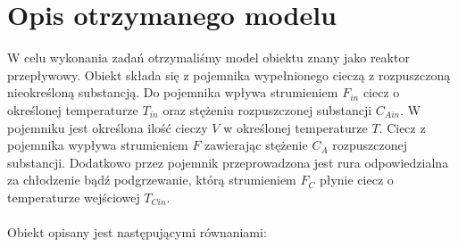 \chapter{Opis otrzymanego modelu}

W celu wykonania zadań otrzymaliśmy model obiektu znany jako reaktor przepływowy. Obiekt składa się z pojemnika wypełnionego cieczą z rozpuszczoną nieokreśloną substancją. Do pojemnika wpływa strumieniem $F_{in}$ ciecz o określonej temperaturze $T_{in}$ oraz stężeniu rozpuszczonej substancji $C_{Ain}$. W pojemniku jest określona ilość cieczy $V$ w określonej temperaturze $T$. Ciecz z pojemnika wypływa strumieniem $F$ zawierając stężenie $C_A$ rozpuszczonej substancji. Dodatkowo przez pojemnik przeprowadzona jest rura odpowiedzialna za chłodzenie bądź podgrzewanie, którą strumieniem $F_C$ płynie ciecz o temperaturze wejściowej $T_{Cin}$.\\\\ Obiekt opisany jest następującymi równaniami:

